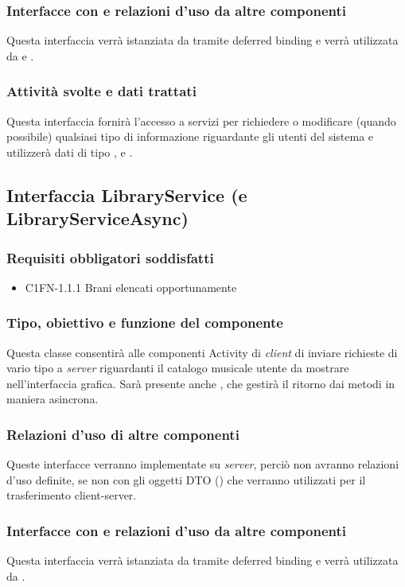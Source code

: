 \subsubsection*{Interfacce con e relazioni d'uso da altre componenti}
Questa interfaccia verr\`a istanziata da  tramite deferred
binding e verr\`a utilizzata da  e .

\subsubsection*{Attivit\`a svolte e dati trattati}
Questa interfaccia fornir\`a l'accesso a servizi per richiedere o
modificare (quando possibile) qualsiasi tipo di informazione riguardante gli
utenti del sistema e utilizzer\`a dati di tipo , 
e .

\subsection{Interfaccia LibraryService (e LibraryServiceAsync)}
\subsubsection*{Requisiti obbligatori soddisfatti}
\begin{itemize}
	\item C1FN-1.1.1 Brani elencati opportunamente
\end{itemize}
\subsubsection*{Tipo, obiettivo e funzione del componente}
Questa classe consentir\`a alle componenti Activity di \emph{client} di inviare
richieste di vario tipo a \emph{server} riguardanti il catalogo musicale utente
da mostrare nell'interfaccia grafica. Sar\`a presente anche
, che gestir\`a il ritorno dai metodi in maniera
asincrona.
\subsubsection*{Relazioni d'uso di altre componenti}
Queste interfacce verranno implementate su \emph{server}, perci\`o non
avranno relazioni d'uso definite, se non con gli oggetti DTO
() che verranno utilizzati per il trasferimento
client-server.
\subsubsection*{Interfacce con e relazioni d'uso da altre componenti}
Questa interfaccia verr\`a istanziata da  tramite deferred
binding e verr\`a utilizzata da .
